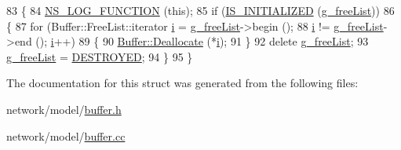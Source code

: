 \begin{DoxyCode}
83 \{
84   \hyperlink{log-macros-disabled_8h_a90b90d5bad1f39cb1b64923ea94c0761}{NS\_LOG\_FUNCTION} (\textcolor{keyword}{this});
85   \textcolor{keywordflow}{if} (\hyperlink{buffer_8cc_a78a2863a61b455820496436fd3c38ebc}{IS\_INITIALIZED} (\hyperlink{classns3_1_1Buffer_a2d52975c7aad897af5a953a854906582}{g\_freeList}))
86     \{
87       \textcolor{keywordflow}{for} (Buffer::FreeList::iterator \hyperlink{bernuolliDistribution_8m_a6f6ccfcf58b31cb6412107d9d5281426}{i} = \hyperlink{classns3_1_1Buffer_a2d52975c7aad897af5a953a854906582}{g\_freeList}->begin ();
88            \hyperlink{bernuolliDistribution_8m_a6f6ccfcf58b31cb6412107d9d5281426}{i} != \hyperlink{classns3_1_1Buffer_a2d52975c7aad897af5a953a854906582}{g\_freeList}->end (); \hyperlink{bernuolliDistribution_8m_a6f6ccfcf58b31cb6412107d9d5281426}{i}++)
89         \{
90           \hyperlink{classns3_1_1Buffer_a5cf2847bcc22da58cfa7e3a6b0279a01}{Buffer::Deallocate} (*\hyperlink{bernuolliDistribution_8m_a6f6ccfcf58b31cb6412107d9d5281426}{i});
91         \}
92       \textcolor{keyword}{delete} \hyperlink{classns3_1_1Buffer_a2d52975c7aad897af5a953a854906582}{g\_freeList};
93       \hyperlink{classns3_1_1Buffer_a2d52975c7aad897af5a953a854906582}{g\_freeList} = \hyperlink{buffer_8cc_a46b94c2de575a7a8a76bc37b8628d115}{DESTROYED};
94     \}
95 \}
\end{DoxyCode}


The documentation for this struct was generated from the following files\+:\begin{DoxyCompactItemize}
\item 
network/model/\hyperlink{buffer_8h}{buffer.\+h}\item 
network/model/\hyperlink{buffer_8cc}{buffer.\+cc}\end{DoxyCompactItemize}
